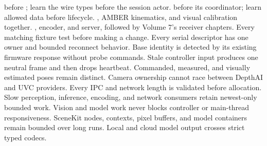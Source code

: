  before ; learn the wire types before the session actor.\markdownRendererOlItemEnd 
{} before its coordinator; learn allowed data before lifecycle.\markdownRendererOlItemEnd 
{}, AMBER kinematics, and visual calibration together.\markdownRendererOlItemEnd 
{}, encoder, and server, followed by Volume 7's receiver chapters.\markdownRendererOlItemEnd 
{}Every matching fixture test before making a change.\markdownRendererOlItemEnd 
\markdownRendererOlEnd \markdownRendererInterblockSeparator
{}
\markdownRendererSectionEnd \markdownRendererSectionBegin
{}\markdownRendererInterblockSeparator
{}\markdownRendererUlBegin
\markdownRendererUlItem \markdownRendererUntickedBox{} Every serial descriptor has one owner and bounded reconnect behavior.\markdownRendererUlItemEnd 
\markdownRendererUlItem \markdownRendererUntickedBox{} Base identity is detected by its existing firmware response without probe commands.\markdownRendererUlItemEnd 
\markdownRendererUlItem \markdownRendererUntickedBox{} Stale controller input produces one neutral frame and then drops heartbeat.\markdownRendererUlItemEnd 
\markdownRendererUlItem \markdownRendererUntickedBox{} Commanded, measured, and visually estimated poses remain distinct.\markdownRendererUlItemEnd 
\markdownRendererUlItem \markdownRendererUntickedBox{} Camera ownership cannot race between DepthAI and UVC providers.\markdownRendererUlItemEnd 
\markdownRendererUlItem \markdownRendererUntickedBox{} Every IPC and network length is validated before allocation.\markdownRendererUlItemEnd 
\markdownRendererUlItem \markdownRendererUntickedBox{} Slow perception, inference, encoding, and network consumers retain newest-only bounded work.\markdownRendererUlItemEnd 
\markdownRendererUlItem \markdownRendererUntickedBox{} Vision and model work never blocks controller or main-thread responsiveness.\markdownRendererUlItemEnd 
\markdownRendererUlItem \markdownRendererUntickedBox{} SceneKit nodes, contexts, pixel buffers, and model containers remain bounded over long runs.\markdownRendererUlItemEnd 
\markdownRendererUlItem \markdownRendererUntickedBox{} Local and cloud model output crosses strict typed codecs.\markdownRendererUlItemEnd 
